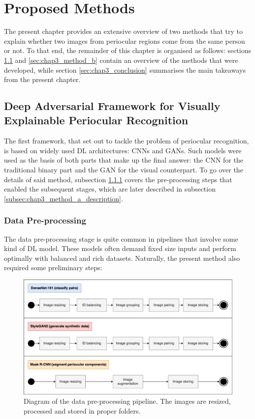 \chapter{Proposed Methods}
\label{chap3:proposed_methods}

The present chapter provides an extensive overview of two methods that try to explain whether two images from periocular regions come from the same person or not. To that end, the remainder of this chapter is organised as follows: sections \ref{sec:chap3_method_a} and \ref{sec:chap3_method_b} contain an overview of the methods that were developed, while section \ref{sec:chap3_conclusion} summarises the main takeaways from the present chapter.

\section{Deep Adversarial Framework for Visually Explainable Periocular Recognition}
\label{sec:chap3_method_a}

The first framework, that set out to tackle the problem of periocular recognition, is based on widely used \ac{DL} architectures: \ac{CNN}s and \ac{GAN}s. Such models were used as the basis of both parts that make up the final answer: the \ac{CNN} for the traditional binary part and the \ac{GAN} for the visual counterpart. To go over the details of said method, subsection \ref{subsec:chap3_method_a_data_preprocessing} covers the pre-processing steps that enabled the subsequent stages, which are later described in subsection \ref{subsec:chap3_method_a_description}.

\subsection{Data Pre-processing}
\label{subsec:chap3_method_a_data_preprocessing}

The data pre-processing stage is quite common in pipelines that involve some kind of \ac{DL} model. These models often demand fixed size inputs and perform optimally with balanced and rich datasets. Naturally, the present method also required some preliminary steps:

\begin{figure}[H]
\centering
\includegraphics[width=370pt]{figures/figure_26.pdf}
\caption{Diagram of the data pre-processing pipeline. The images are resized, processed and stored in proper folders.}
\label{fig:method_a_data_pre_processing_diagram}
\end{figure}

